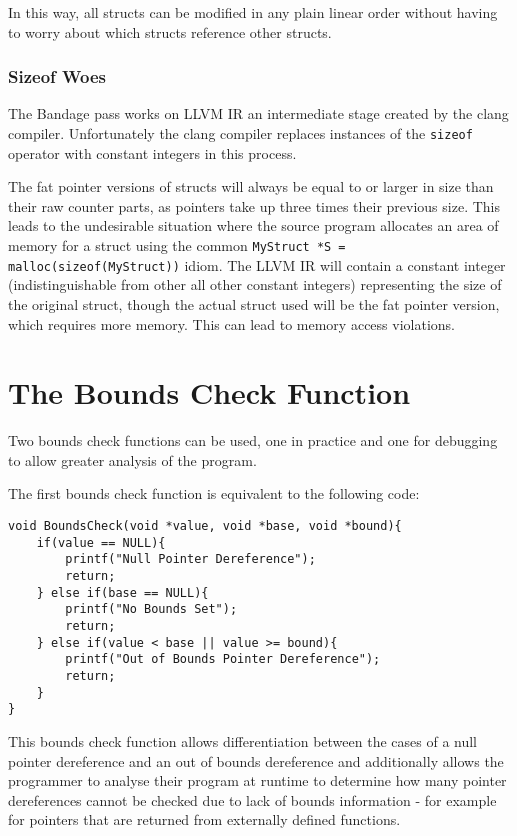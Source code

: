 In this way, all structs can be modified in any plain linear order without having to worry about which structs reference other structs.
	
\subsubsection{Sizeof Woes}

The Bandage pass works on LLVM IR an intermediate stage created by the clang compiler.
Unfortunately the clang compiler replaces instances of the \verb!sizeof! operator with constant integers in this process.

The fat pointer versions of structs will always be equal to or larger in size than their raw counter parts, as pointers take up three times their previous size.
This leads to the undesirable situation where the source program allocates an area of memory for a struct using the common \verb!MyStruct *S = malloc(sizeof(MyStruct))! idiom.
The LLVM IR will contain a constant integer (indistinguishable from other all other constant integers) representing the size of the original struct, though the actual struct used will be the fat pointer version, which requires more memory.
This can lead to memory access violations.

\section{The Bounds Check Function}

Two bounds check functions can be used, one in practice and one for debugging to allow greater analysis of the program.

The first bounds check function is equivalent to the following code:

\begin{verbatim}
void BoundsCheck(void *value, void *base, void *bound){
    if(value == NULL){
        printf("Null Pointer Dereference");
        return;
    } else if(base == NULL){
        printf("No Bounds Set");
        return;
    } else if(value < base || value >= bound){
        printf("Out of Bounds Pointer Dereference");
        return;
    }
}
\end{verbatim}

This bounds check function allows differentiation between the cases of a null pointer dereference and an out of bounds dereference and additionally allows the programmer to analyse their program at runtime to determine how many pointer dereferences cannot be checked due to lack of bounds information - for example for pointers that are returned from externally defined functions.

